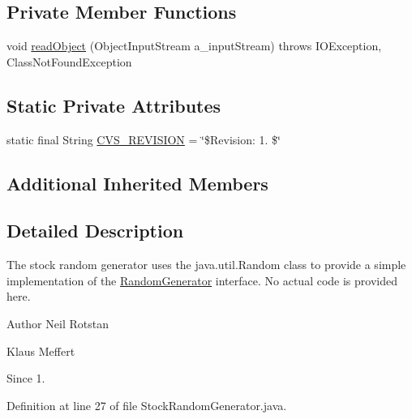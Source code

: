 \subsection*{Private Member Functions}
\begin{DoxyCompactItemize}
\item 
void \hyperlink{classorg_1_1jgap_1_1impl_1_1_stock_random_generator_ada38ddff9a2d5771b18674b314fba773}{read\-Object} (Object\-Input\-Stream a\-\_\-input\-Stream)  throws I\-O\-Exception, Class\-Not\-Found\-Exception 
\end{DoxyCompactItemize}
\subsection*{Static Private Attributes}
\begin{DoxyCompactItemize}
\item 
static final String \hyperlink{classorg_1_1jgap_1_1impl_1_1_stock_random_generator_a3968f0c55114657f8d37a9b522f14625}{C\-V\-S\-\_\-\-R\-E\-V\-I\-S\-I\-O\-N} = \char`\"{}\$Revision\-: 1. \$\char`\"{}
\end{DoxyCompactItemize}
\subsection*{Additional Inherited Members}


\subsection{Detailed Description}
The stock random generator uses the java.\-util.\-Random class to provide a simple implementation of the \hyperlink{interfaceorg_1_1jgap_1_1_random_generator}{Random\-Generator} interface. No actual code is provided here.

\begin{DoxyAuthor}{Author}
Neil Rotstan 

Klaus Meffert 
\end{DoxyAuthor}
\begin{DoxySince}{Since}
1. 
\end{DoxySince}


Definition at line 27 of file Stock\-Random\-Generator.\-java.



